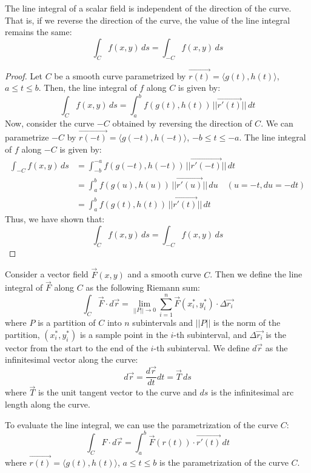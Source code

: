 \documentclass[11pt]{report}
\begin{document}
\begin{theorem} The line integral of a scalar field is independent of the direction of the curve. That is, if we reverse the direction of the curve, the value of the line integral remains the same:
\begin{equation}
    \int_C f(x,y) \, ds = \int_{-C} f(x,y) \, ds
\end{equation}
\end{theorem}
\begin{proof}
    Let $C$ be a smooth curve parametrized by $\vec{r(t)} = \langle g(t), h(t) \rangle$, $a \leq t \leq b$. Then, the line integral of $f$ along $C$ is given by:
    \begin{equation}
        \int_C f(x,y) \, ds = \int_a^b f(g(t), h(t)) \, ||\vec{r'(t)}|| \, dt
    \end{equation}
    Now, consider the curve $-C$ obtained by reversing the direction of $C$. We can parametrize $-C$ by $\vec{r(-t)} = \langle g(-t), h(-t) \rangle$, $-b \leq t \leq -a$. The line integral of $f$ along $-C$ is given by:
    \begin{align*}
        \int_{-C} f(x,y) \, ds &= \int_{-b}^{-a} f(g(-t), h(-t)) \, ||\vec{r'(-t)}|| \, dt \\
        &= \int_a^b f(g(u), h(u)) \, ||\vec{r'(u)}|| \, du \quad (u = -t, du = -dt) \\
        &= \int_a^b f(g(t), h(t)) \, ||\vec{r'(t)}|| \, dt
    \end{align*}
    Thus, we have shown that:
    $$
        \int_C f(x,y) \, ds = \int_{-C} f(x,y) \, ds
    $$
\end{proof}

\begin{definition}
    Consider a vector field $\vec{F}(x,y)$ and a smooth curve $C$. Then we define the line integral of $\vec{F}$ along $C$ as the following Riemann sum:
    \begin{equation}
        \int_C \vec{F} \cdot d\vec{r} = \lim_{||P|| \to 0} \sum_{i=1}^n \vec{F}(x_i^*, y_i^*) \cdot \Delta \vec{r_i}
    \end{equation}
    where $P$ is a partition of $C$ into $n$ subintervals and $||P||$ is the norm of the partition, $(x_i^*, y_i^*)$ is a sample point in the $i$-th subinterval, and $\Delta \vec{r_i}$ is the vector from the start to the end of the $i$-th subinterval. We define $d \vec{r}$ as the infinitesimal vector along the curve:
    \begin{equation}
        d\vec{r} = \frac{d\vec{r}}{dt} dt = \vec{T} \, ds
    \end{equation}
    where $\vec{T}$ is the unit tangent vector to the curve and $ds$ is the infinitesimal arc length along the curve.

    To evaluate the line integral, we can use the parametrization of the curve $C$:
    \begin{equation}
        \int_C F \cdot d\vec{r} = \int_a^b \vec{F}(r(t)) \cdot \vec{r'(t)} \, dt
    \end{equation}
    where $\vec{r(t)} = \langle g(t), h(t) \rangle$, $a \leq t \leq b$ is the parametrization of the curve $C$.
\end{definition}
\end{document}
